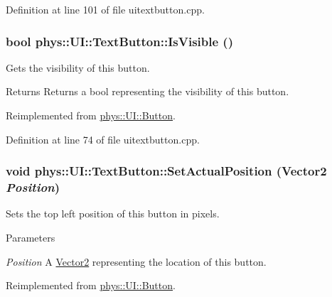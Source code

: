 Definition at line 101 of file uitextbutton.cpp.

\hypertarget{classphys_1_1UI_1_1TextButton_a505167a00d343d704df1f759cd12ed1e}{
\subsubsection[{IsVisible}]{\setlength{\rightskip}{0pt plus 5cm}bool phys::UI::TextButton::IsVisible ()}}
\label{df/d03/classphys_1_1UI_1_1TextButton_a505167a00d343d704df1f759cd12ed1e}


Gets the visibility of this button. 

\begin{DoxyReturn}{Returns}
Returns a bool representing the visibility of this button. 
\end{DoxyReturn}


Reimplemented from \hyperlink{classphys_1_1UI_1_1Button_a2bca8ace690157fa2646bcf1cb54397a}{phys::UI::Button}.



Definition at line 74 of file uitextbutton.cpp.

\hypertarget{classphys_1_1UI_1_1TextButton_ab459720bb401b99ebc4a5287e36a91ee}{
\subsubsection[{SetActualPosition}]{\setlength{\rightskip}{0pt plus 5cm}void phys::UI::TextButton::SetActualPosition ({\bf Vector2} {\em Position})}}
\label{df/d03/classphys_1_1UI_1_1TextButton_ab459720bb401b99ebc4a5287e36a91ee}


Sets the top left position of this button in pixels. 


\begin{DoxyParams}{Parameters}
\item[{\em Position}]A \hyperlink{classphys_1_1Vector2}{Vector2} representing the location of this button. \end{DoxyParams}


Reimplemented from \hyperlink{classphys_1_1UI_1_1Button_a90ef37a2fa1645298237733918455814}{phys::UI::Button}.



